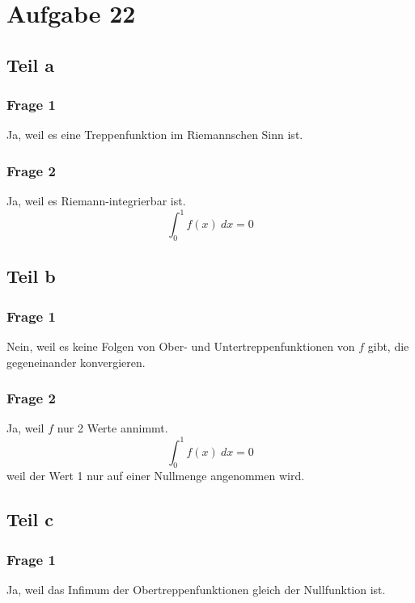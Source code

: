 \documentclass[10pt,a4paper]{article}
\begin{document}
\section{Aufgabe 22}

\subsection{Teil a}

\subsubsection{Frage 1}
Ja, weil es eine Treppenfunktion im Riemannschen Sinn ist.

\subsubsection{Frage 2}
Ja, weil es Riemann-integrierbar ist.
\begin{equation}
  \int_{0}^{1} f(x)\ dx = 0
\end{equation}

\subsection{Teil b}

\subsubsection{Frage 1}
Nein, weil es keine Folgen von Ober- und Untertreppenfunktionen von $f$ gibt, die gegeneinander konvergieren.

\subsubsection{Frage 2}
Ja, weil $f$ nur 2 Werte annimmt.
\begin{equation}
  \int_{0}^{1} f(x)\ dx = 0
\end{equation}
weil der Wert 1 nur auf einer Nullmenge angenommen wird.

\subsection{Teil c}

\subsubsection{Frage 1}
Ja, weil das Infimum der Obertreppenfunktionen gleich der Nullfunktion ist.
\end{document}
